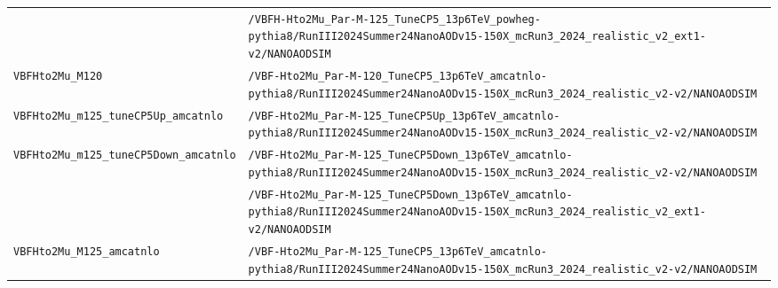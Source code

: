 \begin{longtable}{@{}>{\RaggedRight\arraybackslash}p{} >{\RaggedRight\arraybackslash}p{}@{}}
 & \texttt{/\allowbreak{}VBFH-\allowbreak{}Hto2Mu\_\allowbreak{}Par-\allowbreak{}M-\allowbreak{}125\_\allowbreak{}TuneCP5\_\allowbreak{}13p6TeV\_\allowbreak{}powheg-\allowbreak{}pythia8/\allowbreak{}RunIII2024Summer24NanoAODv15-\allowbreak{}150X\_\allowbreak{}mcRun3\_\allowbreak{}2024\_\allowbreak{}realistic\_\allowbreak{}v2\_\allowbreak{}ext1-\allowbreak{}v2/\allowbreak{}NANOAODSIM} \\
\addlinespace[2pt]
\texttt{VBFHto2Mu\_\allowbreak{}M120} & \texttt{/\allowbreak{}VBF-\allowbreak{}Hto2Mu\_\allowbreak{}Par-\allowbreak{}M-\allowbreak{}120\_\allowbreak{}TuneCP5\_\allowbreak{}13p6TeV\_\allowbreak{}amcatnlo-\allowbreak{}pythia8/\allowbreak{}RunIII2024Summer24NanoAODv15-\allowbreak{}150X\_\allowbreak{}mcRun3\_\allowbreak{}2024\_\allowbreak{}realistic\_\allowbreak{}v2-\allowbreak{}v2/\allowbreak{}NANOAODSIM} \\
\addlinespace[2pt]
\texttt{VBFHto2Mu\_\allowbreak{}m125\_\allowbreak{}tuneCP5Up\_\allowbreak{}amcatnlo} & \texttt{/\allowbreak{}VBF-\allowbreak{}Hto2Mu\_\allowbreak{}Par-\allowbreak{}M-\allowbreak{}125\_\allowbreak{}TuneCP5Up\_\allowbreak{}13p6TeV\_\allowbreak{}amcatnlo-\allowbreak{}pythia8/\allowbreak{}RunIII2024Summer24NanoAODv15-\allowbreak{}150X\_\allowbreak{}mcRun3\_\allowbreak{}2024\_\allowbreak{}realistic\_\allowbreak{}v2-\allowbreak{}v2/\allowbreak{}NANOAODSIM} \\
\addlinespace[2pt]
\texttt{VBFHto2Mu\_\allowbreak{}m125\_\allowbreak{}tuneCP5Down\_\allowbreak{}amcatnlo} & \texttt{/\allowbreak{}VBF-\allowbreak{}Hto2Mu\_\allowbreak{}Par-\allowbreak{}M-\allowbreak{}125\_\allowbreak{}TuneCP5Down\_\allowbreak{}13p6TeV\_\allowbreak{}amcatnlo-\allowbreak{}pythia8/\allowbreak{}RunIII2024Summer24NanoAODv15-\allowbreak{}150X\_\allowbreak{}mcRun3\_\allowbreak{}2024\_\allowbreak{}realistic\_\allowbreak{}v2-\allowbreak{}v2/\allowbreak{}NANOAODSIM} \\
 & \texttt{/\allowbreak{}VBF-\allowbreak{}Hto2Mu\_\allowbreak{}Par-\allowbreak{}M-\allowbreak{}125\_\allowbreak{}TuneCP5Down\_\allowbreak{}13p6TeV\_\allowbreak{}amcatnlo-\allowbreak{}pythia8/\allowbreak{}RunIII2024Summer24NanoAODv15-\allowbreak{}150X\_\allowbreak{}mcRun3\_\allowbreak{}2024\_\allowbreak{}realistic\_\allowbreak{}v2\_\allowbreak{}ext1-\allowbreak{}v2/\allowbreak{}NANOAODSIM} \\
\addlinespace[2pt]
\texttt{VBFHto2Mu\_\allowbreak{}M125\_\allowbreak{}amcatnlo} & \texttt{/\allowbreak{}VBF-\allowbreak{}Hto2Mu\_\allowbreak{}Par-\allowbreak{}M-\allowbreak{}125\_\allowbreak{}TuneCP5\_\allowbreak{}13p6TeV\_\allowbreak{}amcatnlo-\allowbreak{}pythia8/\allowbreak{}RunIII2024Summer24NanoAODv15-\allowbreak{}150X\_\allowbreak{}mcRun3\_\allowbreak{}2024\_\allowbreak{}realistic\_\allowbreak{}v2-\allowbreak{}v2/\allowbreak{}NANOAODSIM} \\

\end{longtable}
